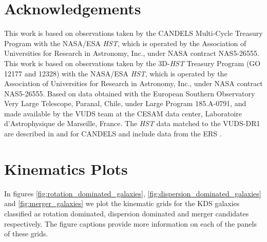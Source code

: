 \documentclass[fleqn,usenatbib]{mn2e}
\begin{document}
\section*{Acknowledgements}

This work is based on observations taken by the CANDELS Multi-Cycle Treasury Program with the NASA/ESA {\em HST}, which is operated by the Association of Universities for Research in Astronomy, Inc., under NASA contract NAS5-26555.
This work is based on observations taken by the 3D-{\em HST} Treasury Program (GO 12177 and 12328) with the NASA/ESA {\em HST}, which is operated by the Association of Universities for Research in Astronomy, Inc., under NASA contract NAS5-26555.
Based on data obtained with the European Southern Observatory Very Large Telescope, Paranal, Chile, under Large Program 185.A-0791, and made available by the VUDS team at the CESAM data center, Laboratoire d'Astrophysique de Marseille, France.
The {\em HST} data matched to the VUDS-DR1 are described in \cite{Grogin2011} and \cite{Koekemoer2011} for CANDELS and include data from the ERS \cite{Windhorst2011}.




%


\clearpage 

%




\appendix

\section{Kinematics Plots}\label{app:kinematics_plots}
In figures \ref{fig:rotation_dominated_galaxies}, \ref{fig:dispersion_dominated_galaxies} and \ref{fig:merger_galaxies} we plot the kinematic grids for the KDS galaxies classified as rotation dominated, dispersion dominated and merger candidates respectively.
The figure captions provide more information on each of the panels of these grids.
\end{document}
